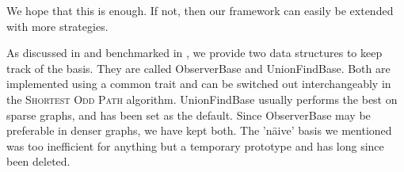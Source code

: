 We hope that this is enough. If not, then our framework can easily be extended with more strategies.

As discussed in  and benchmarked in , we provide two data structures to keep track of the basis. They are called ObserverBase and UnionFindBase. Both are implemented using a common trait and can be switched out interchangeably in the \textsc{Shortest Odd Path} algorithm. UnionFindBase usually performs the best on sparse graphs, and has been set as the default. Since ObserverBase may be preferable in denser graphs, we have kept both. The 'näive' basis we mentioned was too inefficient for anything but a temporary prototype and has long since been deleted.
